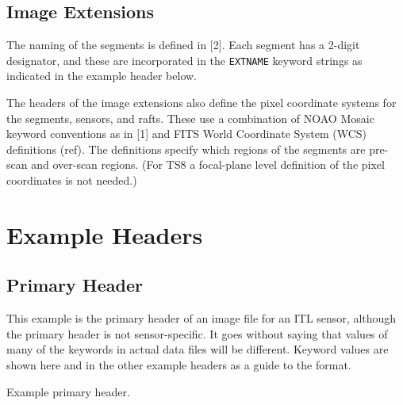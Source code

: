 \documentclass{article}[12pt]
\newcommand{\red}{\textcolor{red}}
\begin{document}
\subsection{Image Extensions}

The naming of the segments is defined in [2].  Each segment has a 2-digit designator, and these are incorporated in the {\tt EXTNAME} keyword strings as indicated in the example header below.

The headers of the image extensions also define the pixel coordinate systems for the segments, sensors, and rafts.  These use a combination of NOAO Mosaic keyword conventions as in [1] and FITS World Coordinate System (WCS) definitions (ref).  The definitions specify which regions of the segments are pre-scan and over-scan regions.  (For TS8 a focal-plane level definition of the pixel coordinates is not needed.)

\section{Example Headers}

\subsection{Primary Header}
This example is the primary header of an image file for an ITL sensor, although the primary header is not sensor-specific.  It goes without saying that values of many of the keywords in actual data files will be different.  Keyword values are shown here and in the other example headers as a guide to the format.


\begin{table}
\begin{alltt}

\end{alltt}
\caption{Example primary header.\label{tab:primary}}
\end{table}
\end{document}
